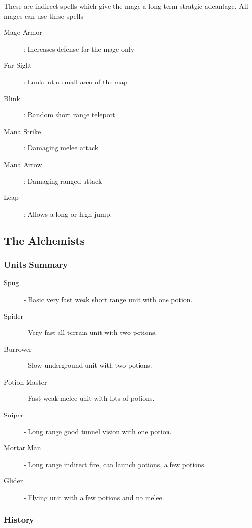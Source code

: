 \documentclass[a4paper]{article}
\begin{document}
These are indirect spells which give the mage a long term stratgic adcantage. All mages can use these spells.
 
\begin{description}
\item[Mage Armor] : Increases defense for the mage only
\item[Far Sight] : Looks at a small area of the map
\item[Blink] : Random short range teleport
\item[Mana Strike] : Damaging melee attack
\item[Mana Arrow] : Damaging ranged attack
\item[Leap] : Allows a long or high jump.
\end{description}

\subsection{The Alchemists}

\subsubsection{Units Summary}

\begin{description}
\item[Spug] - Basic very fast weak short range unit with one potion.
\item[Spider] - Very fast all terrain unit with two potions.
\item[Burrower] - Slow underground unit with two potions.
\item[Potion Master] - Fast weak melee unit with lots of potions.
\item[Sniper] - Long range good tunnel vision with one potion.
\item[Mortar Man] - Long range indirect fire, can launch potions, a few potions.
\item[Glider] - Flying unit with a few potions and no melee.
\end{description}

\subsubsection{History}
\end{document}
